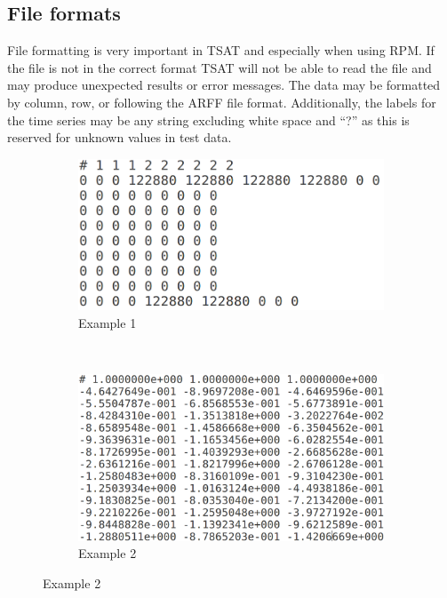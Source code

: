 \documentclass[titlepage, letterpaper, 12pt]{article}
\begin{document}
\subsection{File formats}
\label{RPMFile}
File formatting is very important in TSAT and especially when using RPM.  If the file is not in the correct format TSAT will not be able to read the file and may produce unexpected results or error messages.  The data may be formatted by column, row, or following the ARFF file format. Additionally, the labels for the time series may be any string excluding white space and ``?'' as this is reserved for unknown values in test data.

\begin{figure}[h]
	\caption{Examples of RPM Data}
	\label{fig:rpm-data-exs}
	\begin{subfigure}[b]{0.5\textwidth}
		\includegraphics[width=\textwidth]{rpm_data_example_1}
		\caption{Example 1}
		\label{fig:rpm-data-ex-1}
	\end{subfigure}
	~
	\begin{subfigure}[b]{0.5\textwidth}
		\includegraphics[width=\textwidth]{rpm_data_example_2}
		\caption{Example 2}
		\label{fig:rpm-data-ex-2}
	\end{subfigure}
\end{figure}
\end{document}
